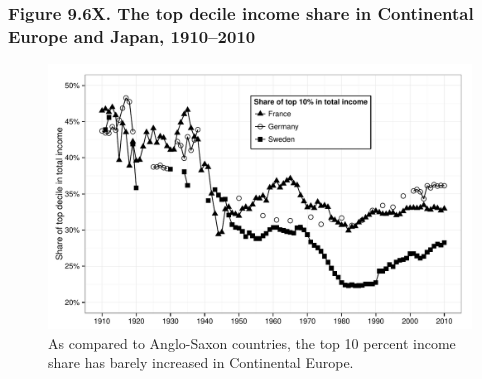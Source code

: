 \documentclass[t]{beamer}\usepackage[]{graphicx}\usepackage[]{color}
\newenvironment{knitrout}{}{} %
\begin{document}
\begin{frame}[label=Figure_9_6X]
\frametitle{Figure 9.6X. The top decile income share in Continental Europe and Japan, 1910--2010}
\begin{figure}[t]
\begin{minipage}[b]{\textwidth}
\centering
\begin{knitrout}\footnotesize
{}\color{fgcolor}

{\centering \includegraphics[width=1\linewidth]{figures/bw/Figure_9_6X} 

}



\end{knitrout}
\caption{As compared to Anglo-Saxon countries, the top 10 percent income share has barely increased in Continental Europe.}
\end{minipage}
\end{figure}
\end{frame}
\end{document}
